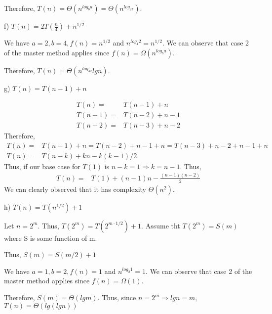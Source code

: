 \documentclass[11pt]{article}
\begin{document}
\begin{flushleft}
Therefore, $T(n) = \Theta(n^{log_ba}) = \Theta(n^{log_27})$.    
\newline

 f) $T(n) = 2T(\frac{n}{4}) + n^{1/2}$
 \newline

We have $a = 2, b = 4, f(n) = n^{1/2}$ and $n^{log_{4}2} = n^{1/2}$. 
We can observe that case 2 of the master method applies since $f(n) = \Omega(n^{log_ba})$. 
 \newline

Therefore, $T(n) = \Theta(n^{log_42}lgn)$.    
\newline

 g) $T(n) = T(n - 1) + n$
\end{flushleft}
\begin{equation*}
    \begin{split}
    T(n) = &T(n - 1) + n \\
    T(n-1) = &T(n - 2) + n - 1 \\
    T(n-2) = &T(n - 3) + n - 2
\end{split}
\end{equation*}
Therefore,
\begin{equation*}
\begin{split}
    T(n) = &T(n - 1) + n = T(n - 2) + n - 1 + n = T (n - 3) + n - 2 + n - 1 + n \\
    T(n) = &T(n - k) + kn - k(k-1)/2
\end{split}
\end{equation*}
Thus, if our base case for $T(1)$ is $n-k = 1 \Rightarrow k = n - 1$. Thus, 
\begin{equation*}
\begin{split}
    T(n) = &T(1) + (n - 1)n - \frac{(n - 1)(n -2)}{2}
\end{split}
\end{equation*}
We can clearly observed that it has complexity $\Theta(n^2)$.

\begin{flushleft}

 h) $T(n) = T(n^{1/2}) + 1$
 \newline

 Let $n = 2^m$. Thus, $T(2^m) = T(2^{m \cdot 1/2}) + 1$. Assume tht $T(2^m) = S(m)$ where S is some function of m.
 \newline

 Thus, $S(m) = S(m/2) + 1$
 \newline

We have $a = 1, b = 2, f(n) = 1$ and $n^{log_{2}1} = 1$. 
We can observe that case 2 of the master method applies since $f(n) = \Omega(1)$. 
 \newline

Therefore, $S(m) = \Theta(lgm)$. Thus, since $n = 2^m \Rightarrow lg n = m$, $T(n) = \Theta(lg (lg n))$    
\newline

\end{flushleft}
\end{document}
